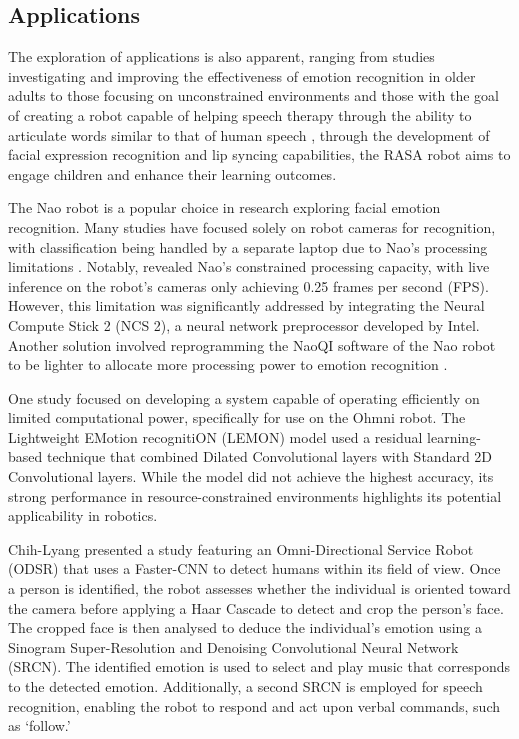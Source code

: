 \subsection{Applications}

The exploration of applications is also apparent, ranging from studies investigating and improving the effectiveness of emotion recognition in older adults \cite{Ma2019-ng} to those focusing on unconstrained environments \cite{Webb2020-bq} and those with the goal of creating a robot capable of helping speech therapy through the ability to articulate words similar to that of human speech \cite{Esfandbod2023-eq}, through the development of facial expression recognition and lip syncing capabilities, the RASA robot aims to engage children and enhance their learning outcomes.

The Nao robot is a popular choice in research exploring facial emotion recognition. Many studies have focused solely on robot cameras for recognition, with classification being handled by a separate laptop due to Nao's processing limitations \cite{Ruiz-Garcia2018-zq}. Notably, \cite{Melinte2020-ky} revealed Nao's constrained processing capacity, with live inference on the robot's cameras only achieving 0.25 frames per second (FPS). However, this limitation was significantly addressed by integrating the Neural Compute Stick 2 (NCS 2), a neural network preprocessor developed by Intel. Another solution involved reprogramming the NaoQI software of the Nao robot to be lighter to allocate more processing power to emotion recognition \cite{Lopez-Rincon2019-et}.

One study focused on developing a system capable of operating efficiently on limited computational power, specifically for use on the Ohmni robot. The Lightweight EMotion recognitiON (LEMON) model \cite{Devaram2022-qc} used a residual learning-based technique that combined Dilated Convolutional layers with Standard 2D Convolutional layers. While the model did not achieve the highest accuracy, its strong performance in resource-constrained environments highlights its potential applicability in robotics.

Chih-Lyang \cite{9982640} presented a study featuring an Omni-Directional Service Robot (ODSR) that uses a Faster-CNN to detect humans within its field of view. Once a person is identified, the robot assesses whether the individual is oriented toward the camera before applying a Haar Cascade to detect and crop the person's face. The cropped face is then analysed to deduce the individual's emotion using a Sinogram Super-Resolution and Denoising Convolutional Neural Network (SRCN). The identified emotion is used to select and play music that corresponds to the detected emotion. Additionally, a second SRCN is employed for speech recognition, enabling the robot to respond and act upon verbal commands, such as `follow.'

